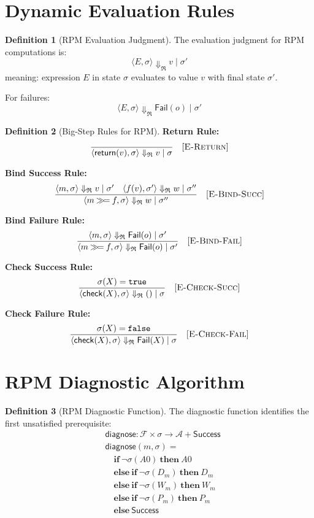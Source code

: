 \documentclass[11pt,twoside,openright]{book}
\theoremstyle{definition}
\newtheorem{definition}{Definition}[chapter]
\theoremstyle{plain}
\theoremstyle{remark}
\newcommand{\Foundations}{\mathcal{F}}
\newcommand{\Acquisitions}{\mathcal{A}}
\newcommand{\RPM}{\mathfrak{R}}
\newcommand{\rpmret}{\mathsf{return}}
\newcommand{\rpmbind}{\mathbin{\gg\!=}}
\newcommand{\bigstep}{\Downarrow}
\newcommand{\AcqState}{\sigma}
\newcommand{\Failed}{\mathsf{Fail}}
\begin{document}
\section{Dynamic Evaluation Rules}

\begin{definition}[RPM Evaluation Judgment]
\label{def:rpm-eval-judgment}
The evaluation judgment for RPM computations is:
\[
\langle E, \sigma \rangle \bigstep_\RPM v \mid \sigma'
\]
meaning: expression $E$ in state $\sigma$ evaluates to value $v$ with final state $\sigma'$.

For failures:
\[
\langle E, \sigma \rangle \bigstep_\RPM \Failed(o) \mid \sigma'
\]
\end{definition}

\begin{definition}[Big-Step Rules for RPM]
\label{def:rpm-bigstep}
\textbf{Return Rule:}
\[
\frac{}{\langle \rpmret(v), \sigma \rangle \bigstep_\RPM v \mid \sigma} \quad [\textsc{E-Return}]
\]

\textbf{Bind Success Rule:}
\[
\frac{\langle m, \sigma \rangle \bigstep_\RPM v \mid \sigma' \quad \langle f(v), \sigma' \rangle \bigstep_\RPM w \mid \sigma''}{\langle m \rpmbind f, \sigma \rangle \bigstep_\RPM w \mid \sigma''} \quad [\textsc{E-Bind-Succ}]
\]

\textbf{Bind Failure Rule:}
\[
\frac{\langle m, \sigma \rangle \bigstep_\RPM \Failed(o) \mid \sigma'}{\langle m \rpmbind f, \sigma \rangle \bigstep_\RPM \Failed(o) \mid \sigma'} \quad [\textsc{E-Bind-Fail}]
\]

\textbf{Check Success Rule:}
\[
\frac{\sigma(X) = \mathtt{true}}{\langle \mathsf{check}(X), \sigma \rangle \bigstep_\RPM () \mid \sigma} \quad [\textsc{E-Check-Succ}]
\]

\textbf{Check Failure Rule:}
\[
\frac{\sigma(X) = \mathtt{false}}{\langle \mathsf{check}(X), \sigma \rangle \bigstep_\RPM \Failed(X) \mid \sigma} \quad [\textsc{E-Check-Fail}]
\]
\end{definition}

\section{RPM Diagnostic Algorithm}

\begin{definition}[RPM Diagnostic Function]
\label{def:rpm-diag}
The diagnostic function identifies the first unsatisfied prerequisite:
\begin{align}
&\mathsf{diagnose} : \Foundations \times \AcqState \to \Acquisitions + \mathsf{Success} \\
&\mathsf{diagnose}(m, \sigma) = \\
&\quad \mathbf{if}\ \neg\sigma(A0)\ \mathbf{then}\ A0 \\
&\quad \mathbf{else\ if}\ \neg\sigma(D_m)\ \mathbf{then}\ D_m \\
&\quad \mathbf{else\ if}\ \neg\sigma(W_m)\ \mathbf{then}\ W_m \\
&\quad \mathbf{else\ if}\ \neg\sigma(P_m)\ \mathbf{then}\ P_m \\
&\quad \mathbf{else}\ \mathsf{Success}
\end{align}
\end{definition}
\end{document}
